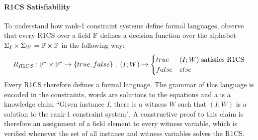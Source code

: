 \paragraph{R1CS Satisfiability}To understand how rank-1 constraint systems define formal languages, observe that every R1CS over a field $\mathbb{F}$ defines a decision function over the alphabet $\Sigma_I \times \Sigma_W = \mathbb{F} \times \mathbb{F}$ in the following way:
\begin{equation}
R_{R1CS} : \mathbb{F}^* \times \mathbb{F}^* \to \{true, false\}\;;\;
(I;W) \mapsto
\begin{cases}
true & (I;W) \text{ satisfies R1CS}\\
false & else
\end{cases}
\end{equation}
Every R1CS therefore defines a formal language. The grammar of this language is encoded in the constraints, words are solutions to the equations and  a  is a knowledge claim ``Given instance $I$, there is a witness $W$ such that $(I;W)$ is a solution to the rank-1 constraint system". A constructive proof to this claim is therefore an assignment of a field element to every witness variable, which is verified whenever the set of all instance and witness variables solves the R1CS. 

